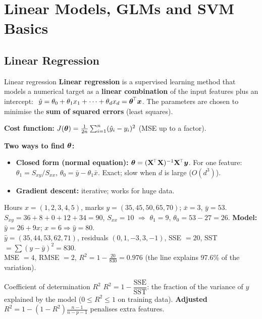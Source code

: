 \chapter{Linear Models, GLMs and SVM Basics}\label{n:linear}

\section{Linear Regression}
\begin{dfn}{Linear regression}
\textbf{Linear regression} is a supervised learning method that models a numerical target as a \textbf{linear combination} of the input features plus an intercept:
$\ \hat y=\theta_0+\theta_1x_1+\dots+\theta_dx_d=\boldsymbol{\theta}^{\!\top}\boldsymbol{x}$.
The parameters are chosen to minimise the \textbf{sum of squared errors} (least squares).
\end{dfn}

\textbf{Cost function:} $J(\boldsymbol{\theta})=\frac1{2n}\sum_{i=1}^n(\hat y_i-y_i)^2$ (MSE up to a factor).

\textbf{Two ways to find $\boldsymbol{\theta}$:}
\begin{itemize}
  \item \textbf{Closed form (normal equation):} $\boldsymbol{\theta}=(\mathbf X^{\!\top}\mathbf X)^{-1}\mathbf X^{\!\top}\boldsymbol{y}$. For one feature: $\theta_1=S_{xy}/S_{xx}$, $\theta_0=\bar y-\theta_1\bar x$. Exact; slow when $d$ is large ($O(d^3)$).
  \item \textbf{Gradient descent:} iterative; works for huge data.
\end{itemize}

\begin{numer}
Hours $x=(1,2,3,4,5)$, marks $y=(35,45,50,65,70)$; $\bar x=3$, $\bar y=53$.\\
$S_{xy}=36+8+0+12+34=90$, $S_{xx}=10$ $\Rightarrow$ $\theta_1=9$, $\theta_0=53-27=26$. \textbf{Model:} $\hat y=26+9x$; $x=6\Rightarrow\hat y=80$.\\
$\hat y=(35,44,53,62,71)$, residuals $(0,1,-3,3,-1)$, SSE $=20$, SST $=\sum(y-\bar y)^2=830$.\\
MSE $=4$, RMSE $=2$, $R^2=1-\frac{20}{830}=\mathbf{0.976}$ (the line explains 97.6\% of the variation).
\end{numer}

\begin{dfn}{Coefficient of determination $R^2$}
$R^2=1-\dfrac{\mathrm{SSE}}{\mathrm{SST}}$: the fraction of the variance of $y$ explained by the model ($0\le R^2\le1$ on training data). \textbf{Adjusted} $R^2=1-(1-R^2)\frac{n-1}{n-p-1}$ penalises extra features.
\end{dfn}

